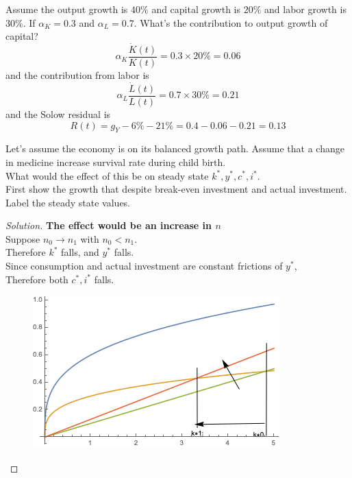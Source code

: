\documentclass[11pt]{article}
\begin{document}
	    \begin{example}
	    	Assume the output growth is $40\%$ and capital growth is $20\%$ and labor growth is $30\%$. If $\alpha_K = 0.3$ and $\alpha_L = 0.7$. What's the contribution to output growth of capital?
	    	\[
	    		\alpha_K \frac{\dot{K}(t)}{K(t)} = 0.3 \times 20\% = 0.06
	    	\]
	    	and the contribution from labor is
	    	\[
	    		\alpha_L \frac{\dot{L}(t)}{L(t)} = 0.7 \times 30\% = 0.21
	    	\]
	    	and the Solow residual is 
	    	\[
	    		R(t) = g_Y - 6\% - 21\% = 0.4 - 0.06 - 0.21 = 0.13
	    	\]
	    \end{example}
	    
	    \begin{example}
	    	Let's assume the economy is on its balanced growth path. Assume that a change in medicine increase survival rate during child birth. \\
	    	What would the effect of this be on steady state $k^*, y^*, c^*, i^*$.\\
	    	First show the growth that despite break-even investment and actual investment. Label the steady state values. \\
	    \end{example}
	    
	    \begin{proof}[Solution]
	    	\textbf{The effect would be an increase in $n$} \\
	    	Suppose $n_0 \to n_1$ with $n_0 < n_1$. \\
	    	Therefore $k^*$ falls, and $y^*$ falls. \\
	    	Since consumption and actual investment are constant frictions of $y^*$, \\
	    	Therefore both $c^*, i^*$ falls.
	    	\begin{figure}[h]
	    		\centering
	    		\includegraphics[width=0.7\linewidth]{figures/4_1}
	    	\end{figure}
	    \end{proof}
	
\end{document}
